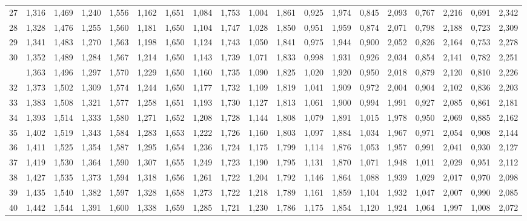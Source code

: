 \documentclass[12pt,a4paper]{article}
\begin{document}
{\begin{longtable}{@{\extracolsep{\fill}}rcccccccccccccccccc@{}}
27 & 1,316 & 1,469 & 1,240 & 1,556 & 1,162 & 1,651 & 1,084 & 1,753 & 1,004 & 1,861 & 0,925 & 1,974 & 0,845 & 2,093 & 0,767 & 2,216 & 0,691 & 2,342 \\
28 & 1,328 & 1,476 & 1,255 & 1,560 & 1,181 & 1,650 & 1,104 & 1,747 & 1,028 & 1,850 & 0,951 & 1,959 & 0,874 & 2,071 & 0,798 & 2,188 & 0,723 & 2,309 \\
29 & 1,341 & 1,483 & 1,270 & 1,563 & 1,198 & 1,650 & 1,124 & 1,743 & 1,050 & 1,841 & 0,975 & 1,944 & 0,900 & 2,052 & 0,826 & 2,164 & 0,753 & 2,278 \\
30 & 1,352 & 1,489 & 1,284 & 1,567 & 1,214 & 1,650 & 1,143 & 1,739 & 1,071 & 1,833 & 0,998 & 1,931 & 0,926 & 2,034 & 0,854 & 2,141 & 0,782 & 2,251 \\
\addlinespace[2pt]
31 & 1,363 & 1,496 & 1,297 & 1,570 & 1,229 & 1,650 & 1,160 & 1,735 & 1,090 & 1,825 & 1,020 & 1,920 & 0,950 & 2,018 & 0,879 & 2,120 & 0,810 & 2,226 \\
32 & 1,373 & 1,502 & 1,309 & 1,574 & 1,244 & 1,650 & 1,177 & 1,732 & 1,109 & 1,819 & 1,041 & 1,909 & 0,972 & 2,004 & 0,904 & 2,102 & 0,836 & 2,203 \\
33 & 1,383 & 1,508 & 1,321 & 1,577 & 1,258 & 1,651 & 1,193 & 1,730 & 1,127 & 1,813 & 1,061 & 1,900 & 0,994 & 1,991 & 0,927 & 2,085 & 0,861 & 2,181 \\
34 & 1,393 & 1,514 & 1,333 & 1,580 & 1,271 & 1,652 & 1,208 & 1,728 & 1,144 & 1,808 & 1,079 & 1,891 & 1,015 & 1,978 & 0,950 & 2,069 & 0,885 & 2,162 \\
35 & 1,402 & 1,519 & 1,343 & 1,584 & 1,283 & 1,653 & 1,222 & 1,726 & 1,160 & 1,803 & 1,097 & 1,884 & 1,034 & 1,967 & 0,971 & 2,054 & 0,908 & 2,144 \\
36 & 1,411 & 1,525 & 1,354 & 1,587 & 1,295 & 1,654 & 1,236 & 1,724 & 1,175 & 1,799 & 1,114 & 1,876 & 1,053 & 1,957 & 0,991 & 2,041 & 0,930 & 2,127 \\
37 & 1,419 & 1,530 & 1,364 & 1,590 & 1,307 & 1,655 & 1,249 & 1,723 & 1,190 & 1,795 & 1,131 & 1,870 & 1,071 & 1,948 & 1,011 & 2,029 & 0,951 & 2,112 \\
38 & 1,427 & 1,535 & 1,373 & 1,594 & 1,318 & 1,656 & 1,261 & 1,722 & 1,204 & 1,792 & 1,146 & 1,864 & 1,088 & 1,939 & 1,029 & 2,017 & 0,970 & 2,098 \\
39 & 1,435 & 1,540 & 1,382 & 1,597 & 1,328 & 1,658 & 1,273 & 1,722 & 1,218 & 1,789 & 1,161 & 1,859 & 1,104 & 1,932 & 1,047 & 2,007 & 0,990 & 2,085 \\
40 & 1,442 & 1,544 & 1,391 & 1,600 & 1,338 & 1,659 & 1,285 & 1,721 & 1,230 & 1,786 & 1,175 & 1,854 & 1,120 & 1,924 & 1,064 & 1,997 & 1,008 & 2,072 \\

\end{longtable}}
\end{document}
